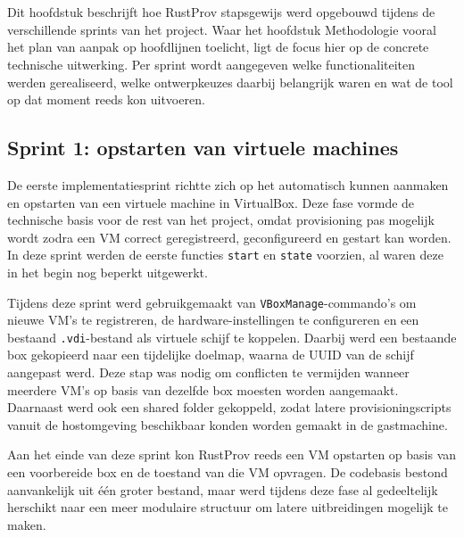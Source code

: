 \chapter{}%

\label{ch:implementatie}

Dit hoofdstuk beschrijft hoe RustProv stapsgewijs werd opgebouwd tijdens de verschillende sprints van het project. Waar het hoofdstuk Methodologie vooral het plan van aanpak op hoofdlijnen toelicht, ligt de focus hier op de concrete technische uitwerking. Per sprint wordt aangegeven welke functionaliteiten werden gerealiseerd, welke ontwerpkeuzes daarbij belangrijk waren en wat de tool op dat moment reeds kon uitvoeren.

\section{Sprint 1: opstarten van virtuele machines}

De eerste implementatiesprint richtte zich op het automatisch kunnen aanmaken en opstarten van een virtuele machine in VirtualBox. Deze fase vormde de technische basis voor de rest van het project, omdat provisioning pas mogelijk wordt zodra een VM correct geregistreerd, geconfigureerd en gestart kan worden. In deze sprint werden de eerste functies \texttt{start} en \texttt{state} voorzien, al waren deze in het begin nog beperkt uitgewerkt.

Tijdens deze sprint werd gebruikgemaakt van \texttt{VBoxManage}-commando's om nieuwe VM's te registreren, de hardware-instellingen te configureren en een bestaand \texttt{.vdi}-bestand als virtuele schijf te koppelen. Daarbij werd een bestaande box gekopieerd naar een tijdelijke doelmap, waarna de UUID van de schijf aangepast werd. Deze stap was nodig om conflicten te vermijden wanneer meerdere VM's op basis van dezelfde box moesten worden aangemaakt. Daarnaast werd ook een shared folder gekoppeld, zodat latere provisioningscripts vanuit de hostomgeving beschikbaar konden worden gemaakt in de gastmachine.

Aan het einde van deze sprint kon RustProv reeds een VM opstarten op basis van een voorbereide box en de toestand van die VM opvragen. De codebasis bestond aanvankelijk uit één groter bestand, maar werd tijdens deze fase al gedeeltelijk herschikt naar een meer modulaire structuur om latere uitbreidingen mogelijk te maken.

